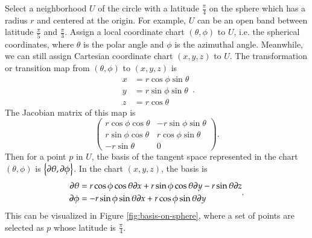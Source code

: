 \documentclass[11pt, a4paper]{book}
\begin{document}
\begin{Example}
  \label{exam:spherical-coordinate-basis}
  Select a neighborhood $U$ of the circle with a latitude $\frac{\pi}{4}$ on the sphere
  which has a radius $r$ and centered at the origin. For example, $U$ can be an open band
  between latitude $\frac{\pi}{5}$ and $\frac{\pi}{3}$. Assign a local coordinate chart
  $(\theta, \phi)$ to $U$, i.e. the spherical coordinates, where $\theta$ is the polar
  angle and $\phi$ is the azimuthal angle. Meanwhile, we can still assign Cartesian
  coordinate chart $(x,y,z)$ to $U$. The transformation or transition map from
  $(\theta, \phi)$ to $(x,y,z)$ is
  \begin{equation}
    \label{eq:spherical-coordinate-transform}
    \begin{aligned}
      x &= r \cos\phi \sin\theta \\
      y &= r \sin\phi \sin\theta \\
      z &= r \cos\theta
    \end{aligned}.
  \end{equation}
  The Jacobian matrix of this map is
  \begin{equation}
    \label{eq:spherical-coordinate-jacobian-matrix}
    \begin{pmatrix}
      r\cos\phi \cos\theta & -r\sin\phi \sin\theta \\
      r \sin\phi \cos\theta & r\cos\phi \sin\theta \\
      -r\sin\theta & 0
    \end{pmatrix}.
  \end{equation}
  Then for a point $p$ in $U$, the basis of the tangent space represented in the chart
  $(\theta, \phi)$ is $\left\{ \boldsymbol{\partial}\theta, \boldsymbol{\partial}\phi \right\}$. In the
  chart $(x,y,z)$, the basis is
  \begin{equation}
    \begin{aligned}
      \boldsymbol{\partial}\theta &= r\cos\phi \cos\theta \boldsymbol{\partial}x + r\sin\phi \cos\theta
      \boldsymbol{\partial}y - r\sin\theta \boldsymbol{\partial}z \\
      \boldsymbol{\partial}\phi &= -r\sin\phi \sin\theta \boldsymbol{\partial}x + r\cos\phi \sin\theta
      \boldsymbol{\partial}y
    \end{aligned}.
  \end{equation}
  This can be visualized in Figure \ref{fig:basis-on-sphere}, where a set of points are
  selected as $p$ whose latitude is $\frac{\pi}{4}$.
  \begin{figure}[htbp]

\end{figure}
\end{Example}
\end{document}
